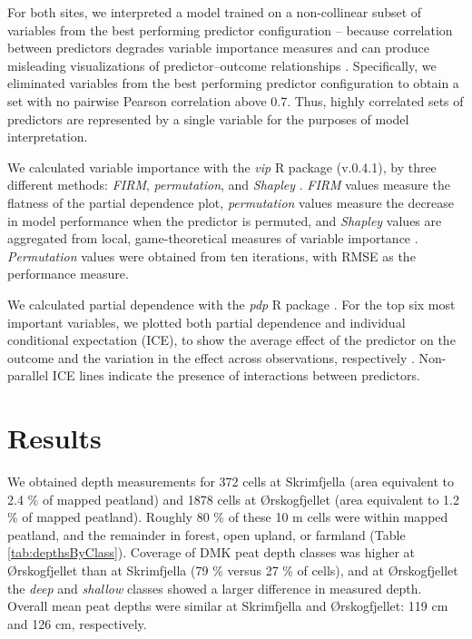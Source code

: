 \documentclass[soil, manuscript]{copernicus}
\begin{document}
For both sites, we interpreted a model trained on a non-collinear subset of variables from the best performing predictor configuration -- because correlation between predictors degrades variable importance measures \citep{stroblConditionalVariableImportance2008, biauRandomForestGuided2016} and can produce misleading visualizations of predictor--outcome relationships \citep{biecekExplanatoryModelAnalysis2021, dwivediExplainableAIXAI2023}.
Specifically, we eliminated variables from the best performing predictor configuration to obtain a set with no pairwise Pearson correlation above 0.7.
Thus, highly correlated sets of predictors are represented by a single variable for the purposes of model interpretation.

We calculated variable importance with the \emph{vip} R package (v.0.4.1), by three different methods: \emph{FIRM}, \emph{permutation}, and \emph{Shapley} \citep{greenwellVariableImportancePlots2020}.
\emph{FIRM} values measure the flatness of the partial dependence plot, \emph{permutation} values measure the decrease in model performance when the predictor is permuted, and \emph{Shapley} values are aggregated from local, game-theoretical measures of variable importance \citep{greenwellVariableImportancePlots2020}.
\emph{Permutation} values were obtained from ten iterations, with RMSE as the performance measure.

We calculated partial dependence with the \emph{pdp} R package \citep[v.0.8.1,][]{greenwellPdpPackageConstructing2017}.
For the top six most important variables, we plotted both partial dependence and individual conditional expectation (ICE), to show the average effect of the predictor on the outcome and the variation in the effect across observations, respectively \citep{goldsteinPeekingBlackBox2015}.
Non-parallel ICE lines indicate the presence of interactions between predictors.

\section{Results}

We obtained depth measurements for 372 cells at Skrimfjella (area equivalent to 2.4 \% of mapped peatland) and 1878 cells at Ørskogfjellet (area equivalent to 1.2 \% of mapped peatland).
Roughly 80 \% of these 10 m cells were within mapped peatland, and the remainder in forest, open upland, or farmland (Table \ref{tab:depthsByClass}).
Coverage of DMK peat depth classes was higher at Ørskogfjellet than at Skrimfjella (79 \% versus 27 \% of cells), and at Ørskogfjellet the \emph{deep} and \emph{shallow} classes showed a larger difference in measured depth.
Overall mean peat depths were similar at Skrimfjella and Ørskogfjellet: 119 cm and 126 cm, respectively.
\end{document}
